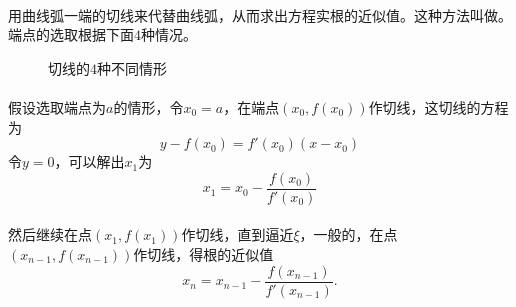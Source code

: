 \paragraph{}
用曲线弧一端的切线来代替曲线弧，从而求出方程实根的近似值。这种方法叫做。端点的选取根据下面$4$种情况。
\begin{figure}[H]
\centering
  \begin{subfigure}[t]{0.45\linewidth}
    \centering
      
  \end{subfigure}
  \begin{subfigure}[t]{0.45\linewidth}
    \centering
      
  \end{subfigure}
  \begin{subfigure}[t]{0.45\linewidth}
    \centering
      
  \end{subfigure}
  \begin{subfigure}[t]{0.45\linewidth}
    \centering
      
  \end{subfigure}

  \caption{切线的$4$种不同情形}
  \label{切线的4种不同情形}
\end{figure}

\paragraph{}
假设选取端点为$a$的情形，令$x_0 = a$，在端点$(x_0,f(x_0))$作切线，这切线的方程为
\begin{equation*}
  y - f(x_0) = f'(x_0)(x-x_0)
\end{equation*}
令$y=0$，可以解出$x_1$为
\begin{equation*}
  x_1 = x_0 - \frac{f(x_0)}{f'(x_0)}
\end{equation*}

\paragraph{}
然后继续在点$(x_1,f(x_1))$作切线，直到逼近$\xi$，一般的，在点$(x_{n-1},f(x_{n-1}))$作切线，得根的近似值
\begin{equation}
  x_n = x_{n-1} - \frac{f(x_{n-1})}{f'(x_{n-1})}.
\end{equation}

